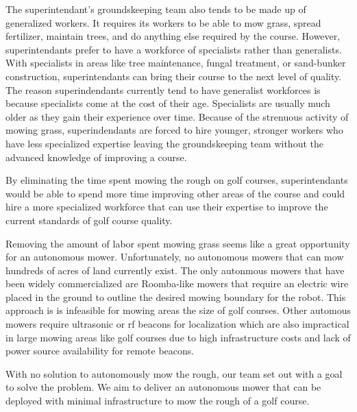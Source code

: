 \documentclass[12pt]{extarticle}
\begin{document}
The superintendant's groundskeeping team also tends to be made up of generalized workers.  It requires its workers to be able to mow grass, spread fertilizer, maintain trees, and do anything else required by the course.  However, superintendants prefer to have a workforce of specialists rather than generalists.  With specialists in areas like tree maintenance, fungal treatment, or sand-bunker construction, superintendants can bring their course to the next level of quality.  The reason superindendants currently tend to have generalist workforces is because specialists come at the cost of their age.  Specialists are usually much older as they gain their experience over time.  Because of the strenuous activity of mowing grass, superindendants are forced to hire younger, stronger workers who have less specialized expertise leaving the groundskeeping team without the advanced knowledge of improving a course.

By eliminating the time spent mowing the rough on golf courses, superintendants would be able to spend more time improving other areas of the course and could hire a more specialized workforce that can use their expertise to improve the current standards of golf course quality.

Removing the amount of labor spent mowing grass seems like a great opportunity for an autonomous mower.  Unfortunately, no autonomous mowers that can mow hundreds of acres of land currently exist.  The only autonmous mowers that have been widely commercialized are Roomba-like mowers that require an electric wire placed in the ground to outline the desired mowing boundary for the robot. This approach is is infeasible for mowing areas the size of golf courses.  Other automous mowers require ultrasonic or rf beacons for localization which are also impractical in large mowing areas like golf courses due to high infrastructure costs and lack of power source availability for remote beacons.

With no solution to autonomously mow the rough, our team set out with a goal to solve the problem.  We aim to deliver an autonomous mower that can be deployed with minimal infrastructure to mow the rough of a golf course.

\newpage
\end{document}
